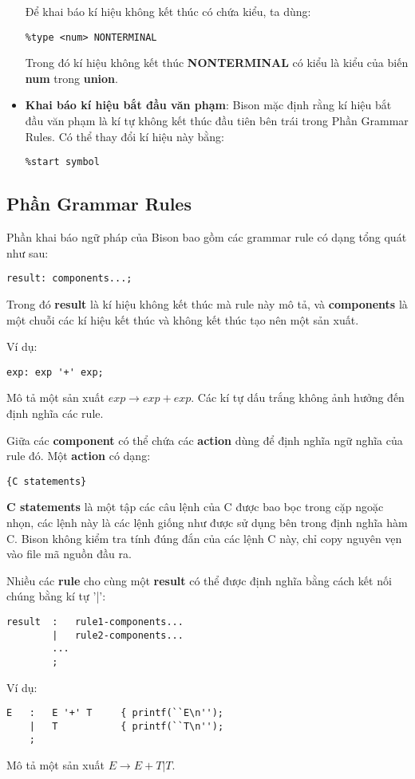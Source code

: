 \documentclass[../report.tex]{subfiles}
\begin{document}
\begin{itemize}
Để khai báo kí hiệu không kết thúc có chứa kiểu, ta dùng: 
\begin{lstlisting}
%type <num> NONTERMINAL
\end{lstlisting}
Trong đó kí hiệu không kết thúc \textbf{NONTERMINAL} 
có kiểu là kiểu của biến \textbf{num} trong \textbf{union}. 
\cite{nonterminal-decl}

\item \textbf{Khai báo kí hiệu bắt đầu văn phạm}: 
\cite{start-symbol}
Bison mặc định rằng kí hiệu bắt đầu văn phạm là kí tự không
kết thúc đầu tiên bên trái trong Phần Grammar Rules. 
Có thể thay đổi kí hiệu này bằng: 
\begin{lstlisting}
%start symbol
\end{lstlisting}

\end{itemize}

\subsection{Phần Grammar Rules}
Phần khai báo ngữ pháp của Bison bao gồm các grammar rule có 
dạng tổng quát như sau: 
\cite{syntax-rules}
\begin{lstlisting}
result: components...;
\end{lstlisting}
Trong đó \textbf{result} là kí hiệu không kết thúc 
mà rule này mô tả, và \textbf{components} là 
một chuỗi các kí hiệu kết thúc và không kết thúc tạo nên một 
sản xuất.

Ví dụ: 
\begin{lstlisting}
exp: exp '+' exp;
\end{lstlisting}
Mô tả một sản xuất $exp \rightarrow exp + exp$.
Các kí tự dấu trắng không ảnh hưởng đến định nghĩa các rule. 

Giữa các \textbf{component} có thể chứa các \textbf{action}
dùng để định nghĩa ngữ nghĩa của rule đó. 
Một \textbf{action} có dạng:
\begin{lstlisting}
{C statements}
\end{lstlisting}
\textbf{C statements} là một tập các câu lệnh của C được bao bọc 
trong cặp ngoặc nhọn, các lệnh này là các lệnh giống như được 
sử dụng bên trong định nghĩa hàm C. 
Bison không kiểm tra tính đúng đắn của các lệnh C này, chỉ copy 
nguyên vẹn vào file mã nguồn đầu ra. 

Nhiều các \textbf{rule} cho cùng một \textbf{result} có thể được 
định nghĩa bằng cách kết nối chúng bằng kí tự '|':
\begin{lstlisting}
result  :   rule1-components...
        |   rule2-components...
        ...
        ;
\end{lstlisting}
Ví dụ: 
\begin{lstlisting}
E   :   E '+' T     { printf(``E\n'');
    |   T           { printf(``T\n'');
    ;
\end{lstlisting}
Mô tả một sản xuất $E \rightarrow E + T | T$.
\end{document}
